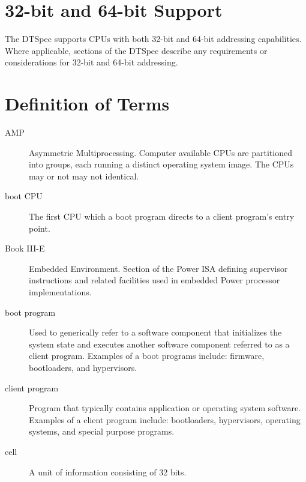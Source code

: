 \documentclass[a4paper,10pt,oneside]{sphinxmanual}
\begin{document}
\section{32-bit and 64-bit Support}
\label{introduction:bit-and-64-bit-support}
The DTSpec supports CPUs with both 32-bit and 64-bit addressing
capabilities. Where applicable, sections of the DTSpec describe any
requirements or considerations for 32-bit and 64-bit addressing.


\section{Definition of Terms}
\label{introduction:definition-of-terms}\begin{description}
\item[{AMP}] \leavevmode{}\label{introduction:term-amp}
Asymmetric Multiprocessing. Computer available CPUs are partitioned into
groups, each running a distinct operating system image. The CPUs
may or not may not identical.

\item[{boot CPU}] \leavevmode{}\label{introduction:term-boot-cpu}
The first CPU which a boot program directs to a client program’s
entry point.

\item[{Book III-E}] \leavevmode{}\label{introduction:term-book-iii-e}
Embedded Environment. Section of the Power ISA defining supervisor
instructions and related facilities used in embedded Power processor
implementations.

\item[{boot program}] \leavevmode{}\label{introduction:term-boot-program}
Used to generically refer to a software component that initializes
the system state and executes another software component referred to
as a client program. Examples of a boot programs include: firmware,
bootloaders, and hypervisors.

\item[{client program}] \leavevmode{}\label{introduction:term-client-program}
Program that typically contains application or operating system
software. Examples of a client program include: bootloaders,
hypervisors, operating systems, and special purpose programs.

\item[{cell}] \leavevmode{}\label{introduction:term-cell}
A unit of information consisting of 32 bits.


\end{description}
\end{document}
